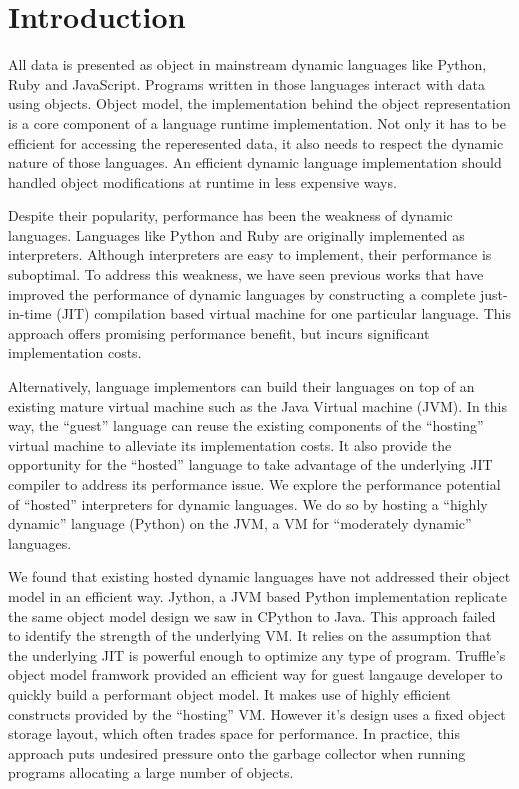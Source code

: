 \section{Introduction}
\label{sec:intro}

All data is presented as object in mainstream dynamic languages like Python, Ruby and JavaScript.
Programs written in those languages interact with data using objects.
Object model, the implementation behind the object representation is a core component of a language runtime implementation.
Not only it has to be efficient for accessing the reperesented data, it also needs to respect the dynamic nature of those languages.
An efficient dynamic language implementation should handled object modifications at runtime in less expensive ways.

Despite their popularity, performance has been the weakness of dynamic languages.
Languages like Python and Ruby are originally implemented as interpreters.
Although interpreters are easy to implement, their performance is suboptimal.
To address this weakness, we have seen previous works that have improved the performance of dynamic languages
by constructing a complete just-in-time (JIT) compilation based virtual machine for one particular language.
This approach offers promising performance benefit, but incurs significant implementation costs.

Alternatively, language implementors can build their languages on top of an existing mature virtual machine such as the Java Virtual machine (JVM).
In this way, the ``guest'' language can reuse the existing components of the ``hosting'' virtual machine to alleviate its implementation costs.
It also provide the opportunity for the ``hosted'' language to take advantage of the underlying JIT compiler to address its performance issue.
We explore the performance potential of ``hosted'' interpreters for dynamic languages.
We do so by hosting a ``highly dynamic'' language (Python) on the JVM, a VM for ``moderately dynamic'' languages.

We found that existing hosted dynamic languages have not addressed their object model in an efficient way.
Jython, a JVM based Python implementation replicate the same object model design we saw in CPython to Java.
This approach failed to identify the strength of the underlying VM.
It relies on the assumption that the underlying JIT is powerful enough to optimize any type of program.
Truffle's object model framwork provided an efficient way for guest langauge developer to quickly build a performant object model.
It makes use of highly efficient constructs provided by the ``hosting'' VM.
However it's design uses a fixed object storage layout, which often trades space for performance.
In practice, this approach puts undesired pressure onto the garbage collector when running programs allocating a large number of objects.

